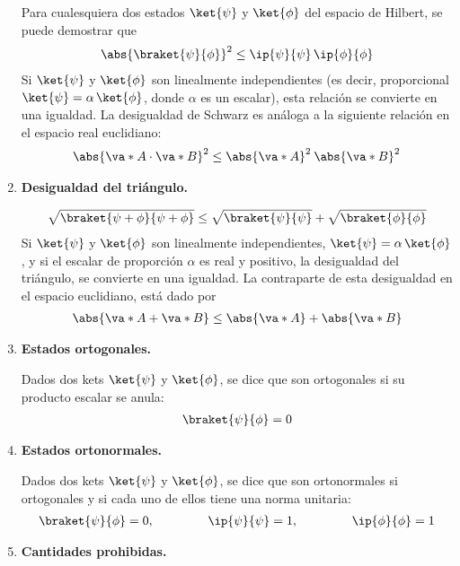 \begin{enumerate}[label=\alph*)]
Para cualesquiera dos estados $\ket{\psi}$ y $\ket{\phi}$ del espacio de Hilbert, se puede demostrar que
\begin{align}
\abs{\braket{\psi}{\phi}}^{2} \leq \ip{\psi}{\psi} \, \ip{\phi}{\phi}
\label{eq:ecuacion_02_34}
\end{align}
Si $\ket{\psi}$ y $\ket{\phi}$ son linealmente independientes (es decir, proporcional $\ket{\psi} = \alpha \, \ket{\phi}$, donde $\alpha$ es un escalar), esta relación se convierte en una igualdad. La desigualdad de Schwarz es análoga a la siguiente relación en el espacio real euclidiano:
\begin{align}
\abs{\va*{A} \cdot \va*{B}}^{2} \leq \abs{\va*{A}}^{2} \: \abs{\va*{B}}^{2}
\label{eq:ecuacion_02_35}
\end{align}
\item \textbf{Desigualdad del triángulo.}

\begin{align}
\sqrt{\braket{\psi + \phi}{\psi + \phi}} \leq \sqrt{\braket{\psi}{\psi}} + \sqrt{\braket{\phi}{\phi}}
\label{eq:ecuacion_02_36}
\end{align}
Si $\ket{\psi}$ y $\ket{\phi}$ son linealmente independientes, $\ket{\psi} = \alpha \, \ket{\phi}$, y si el escalar de proporción $\alpha$ es real y positivo, la desigualdad del triángulo, se convierte en una igualdad. La contraparte de esta desigualdad en el espacio euclidiano, está dado por
\begin{align*}
\abs{\va*{A} +  \va*{B}} \leq \abs{\va*{A}} + \abs{\va*{B}}
\end{align*}
\item \textbf{Estados ortogonales.}

Dados dos kets $\ket{\psi}$ y $\ket{\phi}$, se dice que son ortogonales si su producto escalar se anula:
\begin{align}
\braket{\psi}{\phi} = 0
\label{eq:ecuacion_02_37}
\end{align}
\item \textbf{Estados ortonormales.}

Dados dos kets $\ket{\psi}$ y $\ket{\phi}$, se dice que son ortonormales si ortogonales y si cada uno de ellos tiene una norma unitaria:
\begin{align}
\braket{\psi}{\phi} = 0, \hspace{1.5cm} \ip{\psi}{\psi} = 1, \hspace{1.5cm} \ip{\phi}{\phi} = 1
\label{eq:ecuacion_02_38}
\end{align}
\item \textbf{Cantidades prohibidas.}


\end{enumerate}
